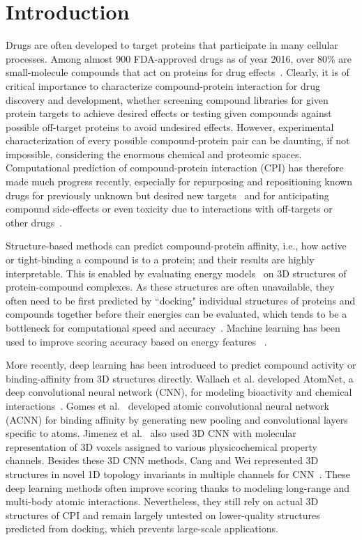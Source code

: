 \documentclass[nocrop]{bioinfo}
\begin{document}
\maketitle
\section{Introduction}
Drugs are often developed to target proteins that participate in many cellular processes.  Among almost 900 FDA-approved drugs as of year 2016, over 80\% are small-molecule compounds that act on proteins for drug effects~\citep{Santos2017}. Clearly, it is of critical importance to characterize compound-protein interaction for drug discovery and development, whether screening compound libraries for given protein targets to achieve desired effects or testing given compounds against possible off-target proteins to avoid undesired effects. However, experimental characterization of every possible compound-protein pair can be daunting, if not impossible, considering the enormous chemical and proteomic spaces. Computational prediction of compound-protein interaction  (CPI) has therefore made much progress recently, especially for repurposing and repositioning known drugs for previously unknown but desired new targets~\citep{keiser2009predicting,PowerJAMA2014} and for anticipating compound side-effects or even toxicity due to interactions with off-targets or other drugs~\citep{Chang2010PLOS, DeepTox}. 

Structure-based methods can predict compound-protein affinity, i.e., how active or tight-binding a compound is to a protein; and their results are highly interpretable. This is enabled by evaluating energy models~\citep{gilson2007calculation} 
on 3D structures of protein-compound complexes. As these structures are often unavailable, they often need to be first predicted by  ``docking" individual structures of proteins and compounds together before their energies can be evaluated, which tends to be a bottleneck for computational speed and accuracy~\citep{Leach2006ProtLig}. Machine learning has been used to improve scoring accuracy based on energy features
~\citep{MLScoringRev2015}.


More recently, deep learning has been introduced to predict compound activity or binding-affinity from 3D structures directly. Wallach et al. developed AtomNet, a deep convolutional neural network  (CNN), for modeling bioactivity and chemical interactions~\citep{wallach2015atomnet}. Gomes et al.~\citep{gomes2017atomic} developed atomic convolutional neural network  (ACNN) for binding affinity by generating new pooling and convolutional layers specific to atoms. Jimenez et al.~\citep{Jimenez2018} also used 3D CNN with molecular representation of 3D voxels assigned to various physicochemical property channels. Besides these 3D CNN methods, Cang and Wei represented 3D structures in novel 1D topology invariants in multiple channels for CNN~\citep{TopologyNet17}.  These deep learning methods often improve scoring thanks to modeling long-range and multi-body atomic interactions.  Nevertheless, they still rely on actual 3D structures of CPI and remain largely untested on lower-quality structures predicted from docking, which prevents large-scale applications. 
\end{document}
